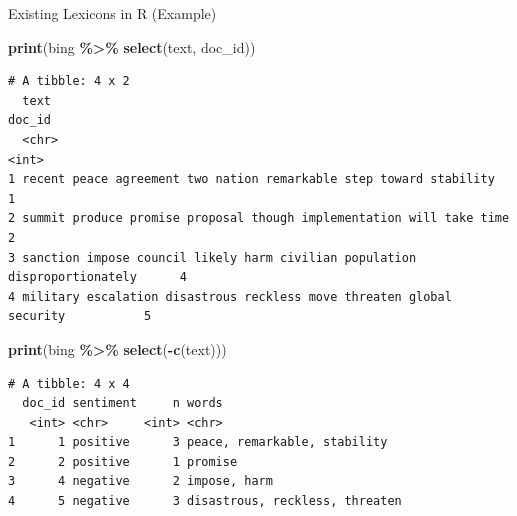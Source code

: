 \documentclass[
  ignorenonframetext,
  aspectratio=169]{beamer}
\newenvironment{Shaded}{\begin{snugshade}}{\end{snugshade}}
\newcommand{\FunctionTok}[1]{\textcolor[rgb]{0.13,0.29,0.53}{\textbf{#1}}}
\newcommand{\NormalTok}[1]{#1}
\newcommand{\SpecialCharTok}[1]{\textcolor[rgb]{0.81,0.36,0.00}{\textbf{#1}}}
\begin{document}
\begin{frame}[fragile]{Existing Lexicons in R (Example)}
\label{existing-lexicons-in-r-example-1}
\scriptsize

\begin{Shaded}
\begin{Highlighting}[]
\FunctionTok{print}\NormalTok{(bing }\SpecialCharTok{\%\textgreater{}\%} \FunctionTok{select}\NormalTok{(text, doc\_id))}
\end{Highlighting}
\end{Shaded}

\begin{verbatim}
# A tibble: 4 x 2
  text                                                                       doc_id
  <chr>                                                                       <int>
1 recent peace agreement two nation remarkable step toward stability              1
2 summit produce promise proposal though implementation will take time            2
3 sanction impose council likely harm civilian population disproportionately      4
4 military escalation disastrous reckless move threaten global security           5
\end{verbatim}

\begin{Shaded}
\begin{Highlighting}[]
\FunctionTok{print}\NormalTok{(bing }\SpecialCharTok{\%\textgreater{}\%} \FunctionTok{select}\NormalTok{(}\SpecialCharTok{{-}}\FunctionTok{c}\NormalTok{(text)))}
\end{Highlighting}
\end{Shaded}

\begin{verbatim}
# A tibble: 4 x 4
  doc_id sentiment     n words                         
   <int> <chr>     <int> <chr>                         
1      1 positive      3 peace, remarkable, stability  
2      2 positive      1 promise                       
3      4 negative      2 impose, harm                  
4      5 negative      3 disastrous, reckless, threaten
\end{verbatim}
\end{frame}
\end{document}
